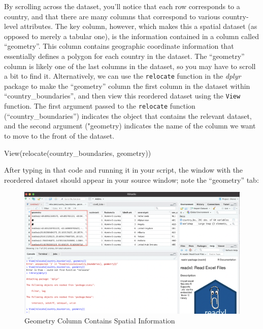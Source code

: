 \documentclass[
]{article}
\newenvironment{Shaded}{\begin{snugshade}}{\end{snugshade}}
\newcommand{\FunctionTok}[1]{\textcolor[rgb]{0.00,0.00,0.00}{#1}}
\newcommand{\NormalTok}[1]{#1}
\begin{document}
By scrolling across the dataset, you'll notice that each row corresponds to a country, and that there are many columns that correspond to various country-level attributes. The key column, however, which makes this a spatial dataset (as opposed to merely a tabular one), is the information contained in a column called ``geometry''. This column contains geographic coordinate information that essentially defines a polygon for each country in the dataset. The ``geometry'' column is likely one of the last columns in the dataset, so you may have to scroll a bit to find it. Alternatively, we can use the \texttt{relocate} function in the \emph{dplyr} package to make the ``geometry'' column the first column in the dataset within ``country\_boundaries'', and then view this reordered dataset using the \texttt{View} function. The first argument passed to the \texttt{relocate} function (``country\_boundaries'') indicates the object that contains the relevant dataset, and the second argument ("geometry) indicates the name of the column we want to move to the front of the dataset.

\begin{Shaded}
\begin{Highlighting}[]
\FunctionTok{View}\NormalTok{(}\FunctionTok{relocate}\NormalTok{(country\_boundaries, geometry))}
\end{Highlighting}
\end{Shaded}

After typing in that code and running it in your script, the window with the reordered dataset should appear in your source window; note the ``geometry'' tab:

\begin{figure}
\includegraphics[width=1\linewidth]{images/geometry} \caption{Geometry Column Contains Spatial Information}\label{fig:unnamed-chunk-18}
\end{figure}
\end{document}
